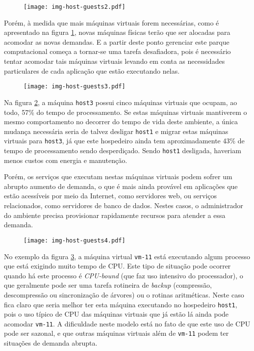 \begin{figure}[htp]
\centering
\texttt{[image: img-host-guests2.pdf]}
\label{fig:hostguests2}
\end{figure}

Porém, à medida que mais máquinas virtuais forem necessárias, como é
apresentado na figura \ref{fig:hostguests2}, novas máquinas físicas terão
que ser alocadas para acomodar as novas demandas. E a partir deste ponto
gerenciar este parque computacional começa a tornar-se uma tarefa
desafiadora, pois é necessário tentar acomodar tais máquinas virtuais
levando em conta as necessidades particulares de cada aplicação que estão
executando nelas.

\begin{figure}[htp]
\centering
\texttt{[image: img-host-guests3.pdf]}
\label{fig:hostguests3}
\end{figure}

Na figura \ref{fig:hostguests3}, a máquina \texttt{host3} possui cinco máquinas
virtuais que ocupam, ao todo, 57\% do tempo de processamento. Se estas
máquinas virtuais mantiverem o mesmo comportamento no decorrer do tempo de
vida deste ambiente, a única mudança necessária seria de talvez desligar
\texttt{host1} e migrar estas máquinas virtuais para \texttt{host3}, já que
este hospedeiro ainda tem aproximadamente 43\% de tempo de processamento
sendo desperdiçado. Sendo \texttt{host1} desligada, haveriam menos custos
com energia e manutenção.

Porém, os serviços que executam nestas máquinas virtuais podem sofrer um
abrupto aumento de demanda, o que é mais ainda provável em aplicações que
estão acessíveis por meio da Internet, como servidores web, ou serviços
relacionados, como servidores de banco de dados. Nestes casos, o
administrador do ambiente precisa provisionar rapidamente recursos para
atender a essa demanda.

\begin{figure}[htp]
\centering
\texttt{[image: img-host-guests4.pdf]}
\label{fig:hostguests4}
\end{figure}

No exemplo da figura \ref{fig:hostguests4}, a máquina virtual
\texttt{vm-11} está executando algum processo que está exigindo muito tempo
de CPU. Este tipo de situação pode ocorrer quando há este processo é
\emph{CPU-bound} (que faz uso intensivo do processador), o que geralmente
pode ser uma tarefa rotineira de \emph{backup} (compressão, descompressão ou
sincronização de árvores) ou o rotinas aritméticas. Neste caso fica claro que
seria melhor ter esta máquina executando no hospedeiro \texttt{host1}, pois o
uso típico de CPU das máquinas virtuais que já estão lá ainda pode acomodar
\texttt{vm-11}. A dificuldade neste modelo está no fato de que este uso de CPU
pode ser sazonal, e que outras máquinas virtuais além de \texttt{vm-11} podem
ter situações de demanda abrupta.

